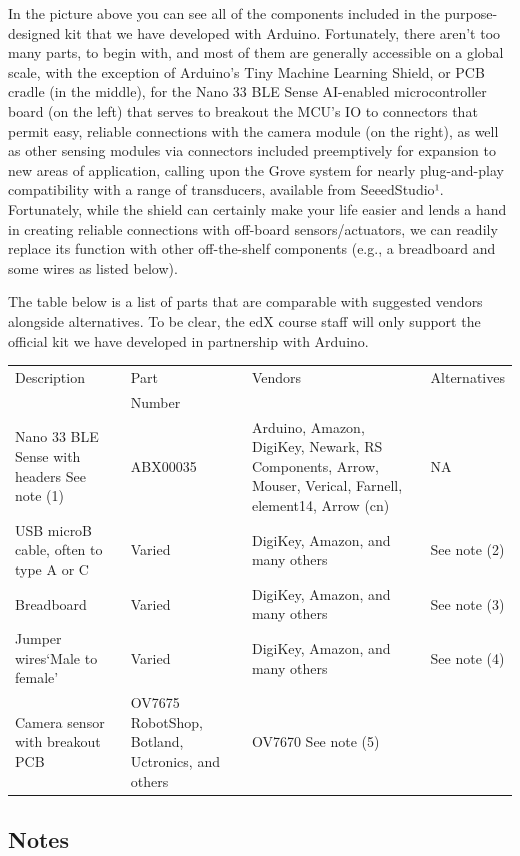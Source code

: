 In the picture above you can see all of the components included in the purpose-designed kit that we have developed with Arduino. Fortunately, there aren’t too many parts, to begin with, and most of them are generally accessible on a global scale, with the exception of Arduino’s Tiny Machine Learning Shield, or PCB cradle (in the middle), for the Nano 33 BLE Sense AI-enabled microcontroller board (on the left) that serves to breakout the MCU’s IO to connectors that permit easy, reliable connections with the camera module (on the right), as well as other sensing modules via connectors included preemptively for expansion to new areas of application, calling upon the Grove system for nearly plug-and-play compatibility with a range of transducers, available from SeeedStudio¹. Fortunately, while the shield can certainly make your life easier and lends a hand in creating reliable connections with off-board sensors/actuators, we can readily replace its function with other off-the-shelf components (e.g., a breadboard and some wires as listed below).

The table below is a list of parts that are comparable with suggested vendors alongside alternatives. To be clear, the edX course staff will only support the official kit we have developed in partnership with Arduino.

\begin{tabular}{l|l|l|l}
  Description & Part   & Vendors	& Alternatives \\
              & Number & &  \\ \hline
Nano 33 BLE Sense with headers 
See note (1)&	ABX00035	&Arduino, Amazon, DigiKey, Newark, RS Components, Arrow, Mouser, Verical, Farnell, element14, Arrow (cn)	& NA \\
USB microB cable, often to type A or C &	Varied &	DigiKey, Amazon, and many others	& See note (2) \\
Breadboard &	Varied	 & DigiKey, Amazon, and many others & 	See note (3) \\
Jumper wires‘Male to female' & Varied & DigiKey, Amazon, and many others & See note (4) \\
Camera sensor with breakout PCB	& OV7675  RobotShop, Botland, Uctronics, and others	& OV7670 See note (5) \\
\end{tabular}

\subsection{Notes}

